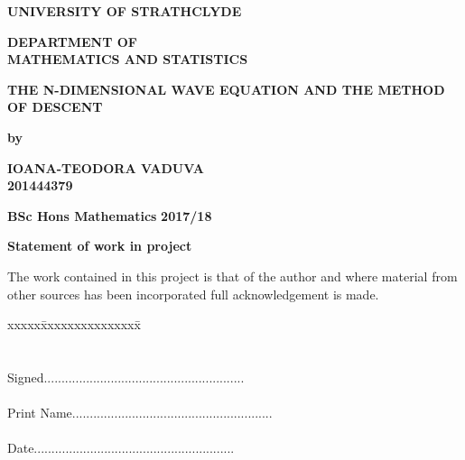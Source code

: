 \documentclass[12pt]{article}
\numberwithin{equation}{section}
\begin{document}
\thispagestyle{empty}
\Large
\vspace*{2cm}
\begin{center}
    \textbf{UNIVERSITY OF STRATHCLYDE}
\end{center}

\vspace*{1cm}
\begin{center}
    \textbf{DEPARTMENT OF\\ MATHEMATICS AND STATISTICS}
\end{center}

\vspace*{1cm}
\begin{center}
    \textbf{THE N-DIMENSIONAL WAVE EQUATION AND THE METHOD OF DESCENT}
\end{center}

\vspace*{1cm}
\begin{center}
    \textbf{by}
\end{center}

\vspace*{1cm}
\begin{center}
    \textbf{IOANA-TEODORA VADUVA}\\
    \textbf{201444379}
\end{center}

\vspace*{3cm}
\begin{center}
    \textbf{BSc Hons Mathematics}
    \textbf{2017/18}
\end{center}

\newpage
\Large

\vspace*{1cm}
\begin{center}
    \textbf{Statement of work in project}
\end{center}

\vspace*{1cm}
\begin{center}
    \parbox{14cm}{
        The work contained in this project is that of the author and where
        material from other sources has been incorporated full acknowledgement
        is made.}
    \end{center}
    
    \begin{center}
        \begin{tabbing}
            xxxxx\=xxxxxxxxxxxxxxx\= \kill
            \\
            \\
            \\
            \>Signed\>.........................................................\\
            \\
            \>Print Name\>.........................................................\\
            \\
            \>Date\>.........................................................\\
        \end{tabbing}
    \end{center}
    
\end{document}
